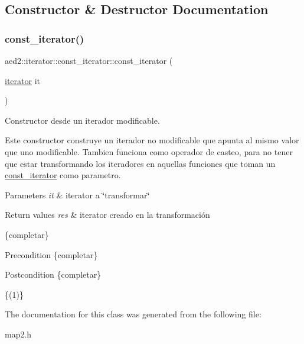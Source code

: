 \subsection{Constructor \& Destructor Documentation}
\mbox{\label{classaed2_1_1iterator_1_1const__iterator_a721711310bb4fc525e4ce9a2b13f7ce9}} 
\subsubsection{\texorpdfstring{const\+\_\+iterator()}{const\_iterator()}}
{\footnotesize\ttfamily aed2\+::iterator\+::const\+\_\+iterator\+::const\+\_\+iterator (\begin{DoxyParamCaption}\item[{\hyperlink{classaed2_1_1iterator_1_1iterator}{iterator}}]{it }\end{DoxyParamCaption})\hspace{0.3cm}{\ttfamily [inline]}}



Constructor desde un iterador modificable. 

Este constructor construye un iterador no modificable que apunta al mismo valor que uno modificable. Tambien funciona como operador de casteo, para no tener que estar transformando los iteradores en aquellas funciones que toman un {\ttfamily \hyperlink{classaed2_1_1iterator_1_1const__iterator}{const\+\_\+iterator}} como parametro.


\begin{DoxyParams}{Parameters}
{\em it} & iterator a \char`\"{}transformar\char`\"{} \\
\hline
\end{DoxyParams}

\begin{DoxyRetVals}{Return values}
{\em res} & iterator creado en la transformación\\
\hline
\end{DoxyRetVals}
\{completar\}

\begin{DoxyPrecond}{Precondition}
\{completar\} 
\end{DoxyPrecond}
\begin{DoxyPostcond}{Postcondition}
\{completar\}
\end{DoxyPostcond}
\{(1)\} 

The documentation for this class was generated from the following file\+:\begin{DoxyCompactItemize}
\item 
map2.\+h\end{DoxyCompactItemize}

